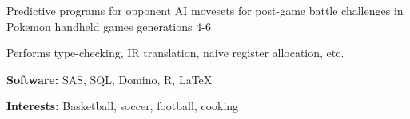 \documentclass{resume}
\begin{document}
\begin{projects}
    \begin{description}
        \item Predictive programs for opponent AI movesets for post-game battle challenges in Pokemon handheld games generations 4-6
        \item Performs type-checking, IR translation, naive register allocation, etc.
    \end{description}

\end{projects}
\begin{skills}
    \begin{description}
        \item \textbf{Software:} SAS, SQL, Domino, R, LaTeX
        \item \textbf{Interests:} Basketball, soccer, football, cooking
    \end{description}
\end{skills}
\end{document}
